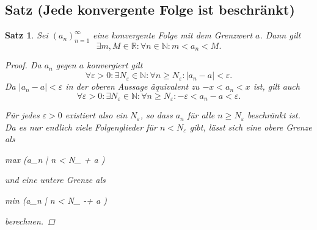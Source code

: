 \documentclass{article}
\newtheorem{thm}{Satz}[section]
\newenvironment{aleq*}{\begin{equation*}\begin{aligned}}{\end{aligned}\end{equation*}}
\begin{document}
	\subsection{Satz (Jede konvergente Folge ist beschränkt)}
	\begin{thm}
		\label{konvergentBeschraenkt}
		Sei \((a_n)_{n=1}^{\infty}\) eine konvergente Folge mit dem Grenzwert \(a\). Dann gilt
		\[
		\exists m,M \in \mathbb{R} \colon \forall n \in \mathbb{N} \colon m < a_n < M \text{.}
		\]
		
		\begin{proof}
			Da \(a_n\) gegen \(a\) konvergiert gilt
		\[
		\forall \varepsilon>0 \colon \exists N_{\varepsilon} \in \mathbb{N} \colon \forall n \geq N_{\varepsilon} \colon |a_n - a| < \varepsilon \text{.}
		\]
		Da \(|a_n - a| < \varepsilon\) in der oberen Aussage äquivalent zu \(-x < a_n < x\) ist, gilt auch
		\[
		\forall \varepsilon>0 \colon \exists N_{\varepsilon} \in \mathbb{N} \colon \forall n \geq N_{\varepsilon} \colon -\varepsilon < a_n - a < \varepsilon \text{.}
		\]
		\par
		Für jedes \(\varepsilon > 0\) existiert also ein \(N_{\varepsilon}\), so dass \(a_n\) für alle \(n \geq N_{\varepsilon}\) beschränkt ist. Da es nur endlich viele Folgenglieder für \(n < N_{\varepsilon}\) gibt, lässt sich eine obere Grenze als 
		\begin{aleq*}
			max (\left\lbrace a_n | n < N_{\varepsilon} \right\rbrace  \cup \lbrace \varepsilon + a \rbrace)
		\end{aleq*}
		 und eine untere Grenze als 
		 \begin{aleq*}
		 	min (\left\lbrace a_n | n < N_{\varepsilon} \rbrace \cup \lbrace -\varepsilon + a \rbrace\right\rbrace)
		 \end{aleq*}
		  berechnen.
		\end{proof}
	\end{thm}
	
\end{document}
